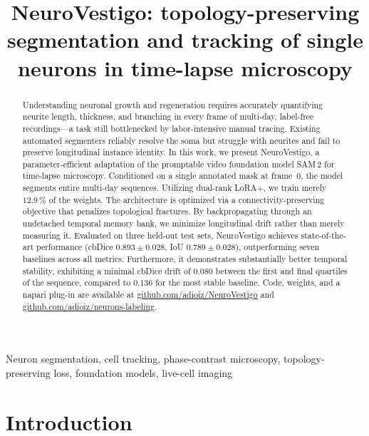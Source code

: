 \documentclass{article}
\title{NeuroVestigo: topology-preserving segmentation and tracking of single
neurons in time-lapse microscopy}
\begin{document}
\maketitle

\begin{abstract}
Understanding neuronal growth and regeneration requires accurately quantifying neurite length, thickness, and branching in every frame of multi-day, label-free recordings---a task still bottlenecked by labor-intensive manual tracing. Existing automated segmenters reliably resolve the soma but struggle with neurites and fail to preserve longitudinal instance identity. In this work, we present NeuroVestigo, a parameter-efficient adaptation of the promptable video foundation model
SAM\,2 for time-lapse microscopy. Conditioned on a single annotated mask at frame~0, the model segments entire multi-day sequences. Utilizing dual-rank LoRA+, we train merely $12.9\,\%$ of the weights. The architecture is optimized via a connectivity-preserving objective that penalizes topological fractures. By backpropagating through an undetached temporal memory bank, we minimize longitudinal drift rather than merely measuring it. Evaluated on three held-out test sets, NeuroVestigo achieves state-of-the-art performance (cbDice $0.893 \pm 0.028$, IoU $0.789 \pm 0.028$), outperforming seven baselines across all metrics. Furthermore, it demonstrates substantially better temporal stability, exhibiting a minimal cbDice drift of $0.080$ between the first and final quartiles of the sequence, compared to $0.136$ for the most stable baseline. Code, weights, and a napari plug-in are available at \url{github.com/adioiz/NeuroVestigo} and \url{github.com/adioiz/neurons-labeling}.
\end{abstract}

\begin{keywords}
Neuron segmentation, cell tracking, phase-contrast microscopy,
topology-preserving loss, foundation models, live-cell imaging
\end{keywords}

\section{Introduction}
\label{sec:intro}
\end{document}
